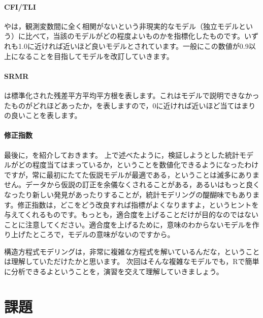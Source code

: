 \documentclass{ltjsbook}
\begin{document}
\paragraph{CFI/TLI}
やは，観測変数間に全く相関がないという非現実的なモデル（独立モデルという）に比べて，当該のモデルがどの程度よいものかを指標化したものです。いずれも1.0に近ければ近いほど良いモデルとされています。一般にこの数値が0.9以上になることを目指してモデルを改訂していきます。
\paragraph{SRMR}
は標準化された残差平方平均平方根を表します。これはモデルで説明できなかったものがどれほどあったか，を表しますので，0に近ければ近いほど当てはまりの良いことを表します。
\paragraph{修正指数}
最後に，を紹介しておきます。
上で述べたように，検証しようとした統計モデルがどの程度当てはまっているか，ということを数値化できるようになったわけですが，常に最初にたてた仮説モデルが最適である，ということは滅多にありません。データから仮説の訂正を余儀なくされることがある，あるいはもっと良くなったり新しい発見があったりすることが，統計モデリングの醍醐味でもあります。修正指数は，どこをどう改良すれば指標がよくなりますよ，というヒントを与えてくれるものです。もっとも，適合度を上げることだけが目的なのではないことに注意してください。適合度を上げるために，意味のわからないモデルを作り上げたところで，モデルの意味がないのですから。


構造方程式モデリングは，非常に複雑な方程式を解いているんだな，ということは理解していただけたかと思います。
次回はそんな複雑なモデルでも，Rで簡単に分析できるよということを，演習を交えて理解していきましょう。
\section{課題}
\end{document}
